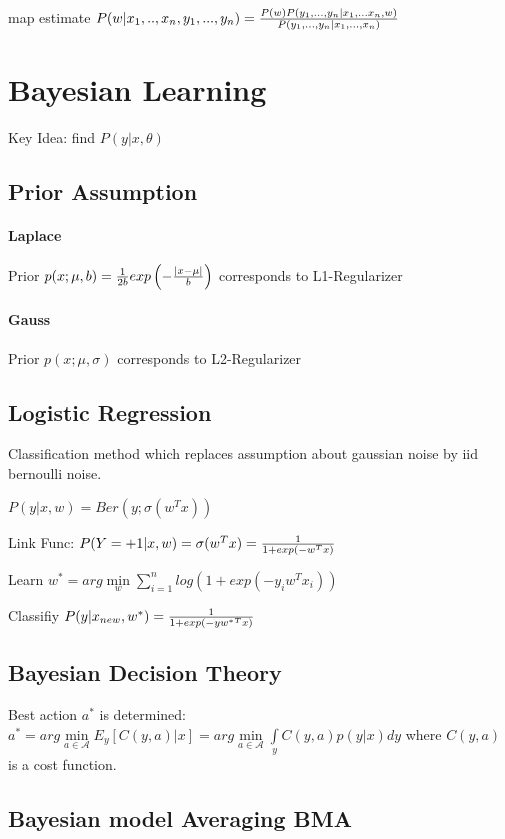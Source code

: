 \documentclass[11pt,twocolumn]{article}
\begin{document}
map estimate $P(w|x_1,..,x_n,y_1,...,y_n) = {{P(w)P(y_1,...,y_n|x_1,...x_n,w)}\over{P(y_1,...,y_n|x_1,...,x_n)}}$	
	
\section{Bayesian Learning}
Key Idea: find $P(y|x,\theta)$
\subsection{Prior Assumption}

\paragraph{Laplace} Prior $p(x;\mu, b) = {1 \over {2b}} exp \left( - {{|x - \mu|}\over{b}} \right)$ corresponds to L1-Regularizer

\paragraph{Gauss} Prior $p(x;\mu, \sigma)$ corresponds to L2-Regularizer

\subsection{Logistic Regression}
Classification method which replaces assumption about gaussian noise by iid bernoulli noise.

$P(y|x,w) = Ber(y; \sigma(w^Tx))$


Link Func: $P(Y=+1|x,w) =  \sigma(w^Tx) = 	{1 \over {1+exp(-w^Tx)}}$

Learn $w^* = arg \min \limits_w \sum \limits_{i=1}^n log \left( 1 + exp(-y_iw^Tx_i) \right)$

Classifiy $P(y|x_{new}, w^* ) = {1 \over {1+exp(-y{w^*}^Tx)}}$

\subsection{Bayesian Decision Theory}

Best action $a^*$ is determined: $a^* = arg \min \limits_{a \in \mathcal{A}} E_y[C(y,a)|x] = arg \min \limits_{a \in \mathcal{A}} \int \limits_y C(y,a)p(y|x) dy$ where $C(y,a)$ is a cost function.




\subsection{Bayesian model Averaging BMA}
\end{document}
